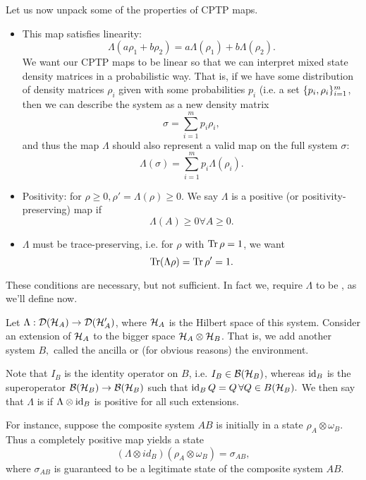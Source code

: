 Let us now unpack some of the properties of CPTP maps.
\begin{itemize}
    \item This map satisfies linearity:
    \begin{equation*}
        \Lambda(a\rho_1 +b\rho_2) = a\Lambda(\rho_1) + b\Lambda(\rho_2).
    \end{equation*}
    We want our CPTP maps to be linear so that we can interpret mixed state density matrices in a probabilistic way. That is, if we have some distribution of density matrices $\rho_i$ given with some probabilities $p_i$ (i.e. a set $\{p_i,\rho_i\}_{i=1}^m$, then we can describe the system as a new density matrix
    \begin{equation*}
        \sigma=\sum_{i=1}^m p_i \rho_i,
    \end{equation*}
    and thus the map $\Lambda$ should also represent a valid map on the full system $\sigma$:
    \begin{equation*}
        \Lambda(\sigma)=\sum_{i=1}^m p_i \Lambda(\rho_i).
    \end{equation*}
    \item Positivity: for $\rho\geq 0, \rho' = \Lambda(\rho) \geq 0$. We say $\Lambda$ is a positive (or positivity-preserving) map if
    \begin{equation}
        \Lambda(A)\geq 0 \forall A \geq 0.
    \end{equation}
    \item $\Lambda$ must be trace-preserving, i.e. for $\rho$ with $\operatorname{Tr} \rho =1$, we want 
    \begin{equation}
        \operatorname{Tr} (\Lambda \rho)=\operatorname{Tr} \rho'=1.
    \end{equation}
\end{itemize}
These conditions are necessary, but not sufficient. In fact we, require $\Lambda$ to be , as we'll define now. 
\begin{defn}
    Let $\Lambda:\mathcal{D}(\mathcal H_A)\to \mathcal{D}(\mathcal H_A')$, where $\mathcal H_A$ is the Hilbert space of this system. Consider an extension of $\mathcal H_A$ to the bigger space $\mathcal H_A \otimes \mathcal H_B$. That is, we add another system $B,$ called the ancilla or (for obvious reasons) the environment. 

    Note that $I_B$ is the identity operator on $B$, i.e. $I_B\in \mathcal{B}(\mathcal H_B)$, whereas $\operatorname{id}_B$ is the superoperator $\mathcal{B}(\mathcal H_B)\to \mathcal{B}(\mathcal H_B)$ such that $\operatorname{id}_B Q=Q \,\forall Q\in B(\mathcal H_B).$ We then say that $\Lambda$ is  if $\Lambda \otimes \operatorname{id}_B$ is positive for all such extensions.
\end{defn}
For instance, suppose the composite system $AB$ is initially in a state $\rho_A\otimes \omega_B$. Thus a completely positive map yields a state
\begin{equation}
    (\Lambda \otimes id_B)(\rho_A \otimes \omega_B)=\sigma_{AB},
\end{equation}
where $\sigma_{AB}$ is guaranteed to be a legitimate state of the composite system $AB$.

